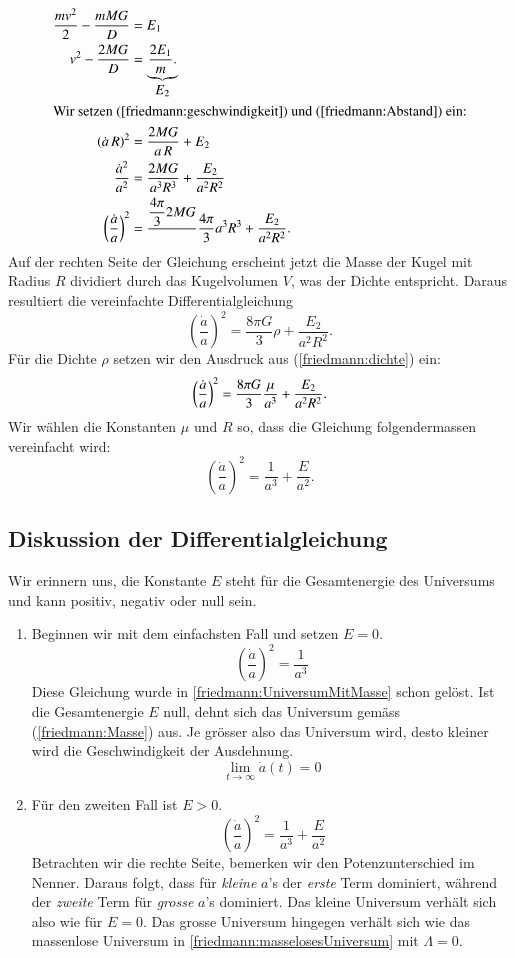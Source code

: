 \begin{refsection}
\begin{align*}
	\frac{m v^2}{2} - \frac{m M G}{D} &= E_1 \\ 
	v^2 - \frac{2 M G}{D} &= \underbrace{\frac{2E_1}{m}.}_{\displaystyle E_2} \\	
	\intertext{Wir setzen (\ref{friedmann:geschwindigkeit}) und (\ref{friedmann:Abstand}) ein:}
	\left( \dot{a} \, R\right)^2 &= \frac{2 M G}{a\,R} + E_2 \\
	\frac{\dot{a}^2}{a^2} &= \frac{2 M G}{a^3 R^3} + \frac{E_2}{a^2 R^2} \\
	\left(\frac{\dot{a}}{a} \right)^2 &= \frac{\displaystyle\frac{4 \pi}{3}2 M G}\displaystyle{\frac{4 \pi}{3} a^3 R^3} + \frac{E_2}{a^2 R^2}.
\end{align*}
Auf der rechten Seite der Gleichung erscheint jetzt die Masse der Kugel mit Radius $R$ dividiert durch das Kugelvolumen $V$, was der Dichte entspricht. Daraus resultiert die vereinfachte Differentialgleichung 
\begin{equation}
\left(\frac{\dot{a}}{a} \right)^2 = \frac{8 \pi G}{3} \rho + \frac{E_2}{a^2 R^2}.
\label{friedmann:EnergieerhaltungUniversum}
\end{equation}
Für die Dichte $\rho$ setzen wir den Ausdruck aus (\ref{friedmann:dichte}) ein:
\[\left(\frac{\dot{a}}{a} \right)^2 = \frac{8 \pi G}{3} \frac{\mu}{a^3} + \frac{E_2}{a^2 R^2}. \\\]
Wir wählen die Konstanten $\mu$ und $R$ so, dass die Gleichung folgendermassen vereinfacht wird:
\begin{equation}
\left(\frac{\dot{a}}{a} \right)^2 = \frac{1}{a^3} + \frac{E}{a^2}.
\end{equation}

\subsection{Diskussion der Differentialgleichung}
Wir erinnern uns, die Konstante $E$ steht für die Gesamtenergie des Universums und kann positiv, negativ oder null sein.
\begin{enumerate}
	\item Beginnen wir mit dem einfachsten Fall und setzen $E = 0$.
	\[\left(\frac{\dot{a}}{a} \right)^2 = \frac{1}{a^3}\]
	Diese Gleichung wurde in \ref{friedmann:UniversumMitMasse} schon gelöst. Ist die Gesamtenergie $E$ null, dehnt sich das Universum gemäss  (\ref{friedmann:Masse}) aus. Je grösser also das Universum wird, desto kleiner wird die Geschwindigkeit der Ausdehnung.
	\[\lim_{t\to\infty} \dot{a}(t) = 0\]
	\item Für den zweiten Fall ist $E > 0$.
	\[\ \left(\frac{\dot{a}}{a} \right)^2 = \frac{1}{a^3} + \frac{E}{a^2}\]
	Betrachten wir die rechte Seite, bemerken wir den Potenzunterschied im Nenner. Daraus folgt, dass für {\em kleine} $a$'s der {\em erste} Term dominiert, während der {\em zweite} Term für {\em grosse} $a$'s dominiert. Das kleine Universum verhält sich also wie für $E = 0$. Das grosse Universum hingegen verhält sich wie das massenlose Universum in \ref{friedmann:masselosesUniversum} mit $\Lambda = 0$.  
	

\end{enumerate}
\end{refsection}
